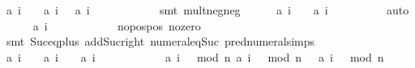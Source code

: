 \begin{isabellebody}
\ {\isacharbackquoteopen}{\isacharquery}a\ {\isacharparenleft}i\ {\isacharplus}\ {}{\isacharparenright}\ {\isacharless}\ {\isacharquery}a\ {\isacharparenleft}i\ {\isacharplus}\ {}{\isacharparenright}{\isacharbackquoteclose}\ {\isacharbackquoteopen}{\isacharquery}a\ {\isacharparenleft}i\ {\isacharplus}\ {}{\isacharparenright}\ {\isacharless}\ {}{\isacharbackquoteclose}\isanewline
\ \ \ \ \ \ \isamarkupfalse%
\ {\isacharparenleft}smt\ mult{\isacharunderscore}neg{\isacharunderscore}neg{\isacharparenright}\isanewline
\ \ \ \ \isamarkupfalse%
\ {\isachardoublequoteopen}{\isacharquery}a\ {\isacharparenleft}i\ {\isacharplus}\ {}{\isacharparenright}\ {\isachargreater}\ {\isacharquery}a\ {\isacharparenleft}i\ {\isacharplus}\ {}{\isacharparenright}{\isachardoublequoteclose}\isanewline
\ \ \ \ \ \ \isamarkupfalse%
\ auto\isanewline
\ \ \ \ \isamarkupfalse%
\ {\isachardoublequoteopen}{\isacharquery}a\ {\isacharparenleft}i\ {\isacharplus}\ {}{\isacharparenright}\ {\isacharless}\ {}{\isachardoublequoteclose}\isanewline
\ \ \ \ \ \ \isamarkupfalse%
\ no{\isacharunderscore}pos{\isacharunderscore}pos\ no{\isacharunderscore}zero\isanewline
\ \ \ \ \ \ \isamarkupfalse%
\ {\isacharparenleft}smt\ Suc{\isacharunderscore}eq{\isacharunderscore}plus{}\ add{\isacharunderscore}Suc{\isacharunderscore}right\ numeral{\isacharunderscore}eq{\isacharunderscore}Suc\ pred{\isacharunderscore}numeral{\isacharunderscore}simps{\isacharparenleft}{}{\isacharparenright}{\isacharparenright}\isanewline
\isanewline
\ \ \ \ \isamarkupfalse%
\ {\isachardoublequoteopen}{\isacharquery}a\ {\isacharparenleft}i{\isacharplus}{}{\isacharparenright}\ {\isachargreater}\ {}\ {\isasymand}\ {\isacharquery}a\ {\isacharparenleft}i{\isacharplus}{}{\isacharparenright}\ {\isacharless}\ {}\ {\isasymand}\ {\isacharquery}a\ {\isacharparenleft}i{\isacharplus}{}{\isacharparenright}\ {\isacharless}\ {}{\isachardoublequoteclose}\isanewline
\ \ \ \ \ \ \isamarkupfalse%
\ {\isacartoucheopen}{}\ {\isacharless}\ a\ {\isacharparenleft}{\isacharparenleft}i\ {\isacharplus}\ {}{\isacharparenright}\ mod\ n{\isacharparenright}{\isacartoucheclose}\ {\isacartoucheopen}a\ {\isacharparenleft}{\isacharparenleft}i\ {\isacharplus}\ {}{\isacharparenright}\ mod\ n{\isacharparenright}\ {\isacharless}\ {}{\isacartoucheclose}\ {\isacartoucheopen}a\ {\isacharparenleft}{\isacharparenleft}i\ {\isacharplus}\ {}{\isacharparenright}\ mod\ n{\isacharparenright}\ {\isacharless}\ {}{\isacartoucheclose}\isanewline

\end{isabellebody}
